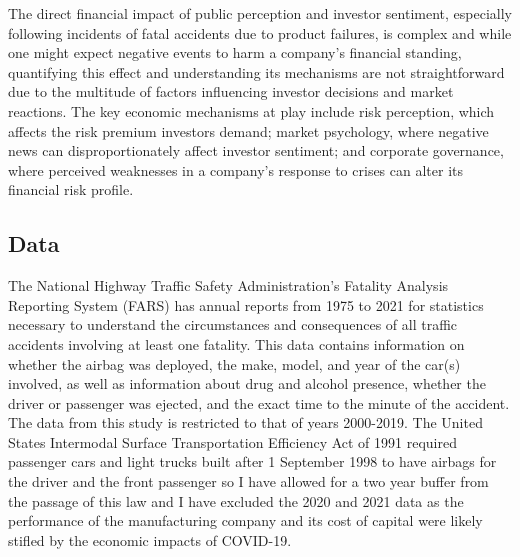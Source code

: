 \documentclass[12pt,a4paper]{article}
\begin{document}
    \hspace{1cm} The direct financial impact of public perception and investor sentiment, especially following incidents of fatal accidents due to product failures, is complex and while one might expect negative events to harm a company's financial standing, quantifying this effect and understanding its mechanisms are not straightforward due to the multitude of factors influencing investor decisions and market reactions. The key economic mechanisms at play include risk perception, which affects the risk premium investors demand; market psychology, where negative news can disproportionately affect investor sentiment; and corporate governance, where perceived weaknesses in a company’s response to crises can alter its financial risk profile. 


\subsection{Data}
    \hspace{1cm} The National Highway Traffic Safety Administration’s Fatality Analysis Reporting System (FARS) has annual reports from 1975 to 2021 for statistics necessary to understand the circumstances and consequences of all traffic accidents involving at least one fatality. This data contains information on whether the airbag was deployed, the make, model, and year of the car(s) involved, as well as information about drug and alcohol presence, whether the driver or passenger was ejected, and the exact time to the minute of the accident. The data from this study is restricted to that of years 2000-2019. The United States Intermodal Surface Transportation Efficiency Act of 1991 required passenger cars and light trucks built after 1 September 1998 to have airbags for the driver and the front passenger so I have allowed for a two year buffer from the passage of this law and I have excluded the 2020 and 2021 data as the performance of the manufacturing company and its cost of capital were likely stifled by the economic impacts of COVID-19. 
    
\end{document}
